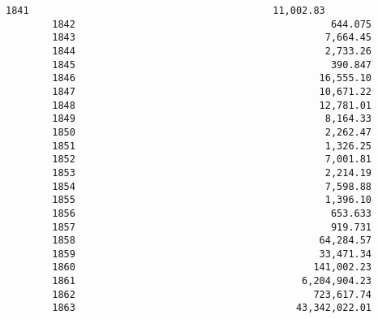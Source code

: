 \documentclass[11pt]{article}
\begin{document}
\begin{Verbatim}[commandchars=\\\{\}]
        1841                                          11,002.83   
        1842                                            644.075   
        1843                                           7,664.45   
        1844                                           2,733.26   
        1845                                            390.847   
        1846                                          16,555.10   
        1847                                          10,671.22   
        1848                                          12,781.01   
        1849                                           8,164.33   
        1850                                           2,262.47   
        1851                                           1,326.25   
        1852                                           7,001.81   
        1853                                           2,214.19   
        1854                                           7,598.88   
        1855                                           1,396.10   
        1856                                            653.633   
        1857                                            919.731   
        1858                                          64,284.57   
        1859                                          33,471.34   
        1860                                         141,002.23   
        1861                                       6,204,904.23   
        1862                                         723,617.74   
        1863                                      43,342,022.01   
        

\end{Verbatim}
\end{document}
